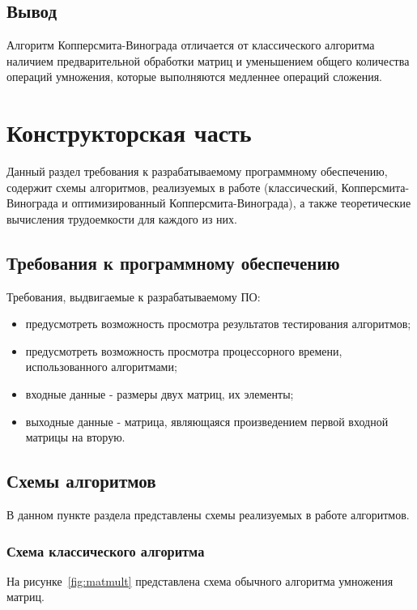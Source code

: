 \documentclass[12pt]{report}
\begin{document}
    \section{Вывод}
    Алгоритм Копперсмита-Винограда отличается от классического алгоритма наличием
    предварительной обработки матриц и уменьшением общего количества операций умножения,
    которые выполняются медленнее операций сложения.
    \newpage


    \chapter{Конструкторская часть}
    Данный раздел требования к разрабатываемому программному обеспечению,
    содержит схемы алгоритмов, реализуемых в работе
    (классический, Копперсмита-Винограда и оптимизированный Копперсмита-Винограда),
    а также теоретические вычисления трудоемкости для каждого из них.


    \section{Требования к программному обеспечению}
    Требования, выдвигаемые к разрабатываемому ПО:
    \begin{itemize}
        \item предусмотреть возможность просмотра результатов тестирования алгоритмов;
        \item предусмотреть возможность просмотра процессорного времени, использованного алгоритмами;
        \item входные данные - размеры двух матриц, их элементы;
        \item выходные данные - матрица, являющаяся произведением первой входной матрицы на вторую.
    \end{itemize}


    \section{Схемы алгоритмов}
    В данном пункте раздела представлены схемы реализуемых в работе алгоритмов.

    \subsection{Схема классического алгоритма}
    На рисунке~\ref{fig:matmult} представлена схема обычного алгоритма умножения матриц.
\end{document}
